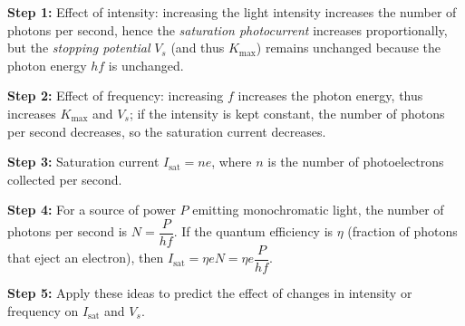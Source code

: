 \documentclass[11pt]{article}
\begin{document}
\begin{methode}
\textbf{Step 1:} Effect of intensity: increasing the light intensity increases the number of photons per second, hence the \emph{saturation photocurrent} increases proportionally, but the \emph{stopping potential} $V_s$ (and thus $K_{\max}$) remains unchanged because the photon energy $hf$ is unchanged.\par
\textbf{Step 2:} Effect of frequency: increasing $f$ increases the photon energy, thus increases $K_{\max}$ and $V_s$; if the intensity is kept constant, the number of photons per second decreases, so the saturation current decreases.\par
\textbf{Step 3:} Saturation current $I_{\text{sat}} = n e$, where $n$ is the number of photoelectrons collected per second.\par
\textbf{Step 4:} For a source of power $P$ emitting monochromatic light, the number of photons per second is $N = \dfrac{P}{hf}$. If the quantum efficiency is $\eta$ (fraction of photons that eject an electron), then $I_{\text{sat}} = \eta e N = \eta e \dfrac{P}{hf}$.\par
\textbf{Step 5:} Apply these ideas to predict the effect of changes in intensity or frequency on $I_{\text{sat}}$ and $V_s$.
\end{methode}
\end{document}
